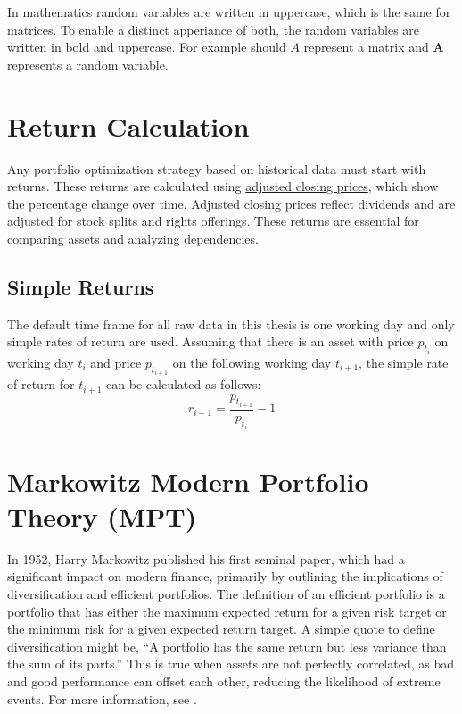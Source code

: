 \documentclass[
  oneside]{book}
\begin{document}
In mathematics random variables are written in uppercase, which is the same for matrices. To enable a distinct apperiance of both, the random variables are written in bold and uppercase. For example should \(A\) represent a matrix and \(\pmb{A}\) represents a random variable.

\hypertarget{return-calculation}{%
\section{Return Calculation}\label{return-calculation}}

Any portfolio optimization strategy based on historical data must start with returns. These returns are calculated using \href{https://www.investopedia.com/terms/a/adjusted\%20closingprice.asp}{adjusted closing prices}, which show the percentage change over time. Adjusted closing prices reflect dividends and are adjusted for stock splits and rights offerings. These returns are essential for comparing assets and analyzing dependencies.

\hypertarget{simple-returns}{%
\subsection{Simple Returns}\label{simple-returns}}

The default time frame for all raw data in this thesis is one working day and only simple rates of return are used. Assuming that there is an asset with price \(p_{t_i}\) on working day \(t_i\) and price \(p_{t_{i+1}}\) on the following working day \(t_{i+1}\), the simple rate of return for \(t_{i+1}\) can be calculated as follows:
\[
  r_{i+1} = \frac{p_{t_{i+1}}}{p_{t_i}}-1
\]

\hypertarget{markowitz-modern-portfolio-theory-mpt}{%
\section{Markowitz Modern Portfolio Theory (MPT)}\label{markowitz-modern-portfolio-theory-mpt}}

In 1952, Harry Markowitz published his first seminal paper, which had a significant impact on modern finance, primarily by outlining the implications of diversification and efficient portfolios. The definition of an efficient portfolio is a portfolio that has either the maximum expected return for a given risk target or the minimum risk for a given expected return target. A simple quote to define diversification might be, ``A portfolio has the same return but less variance than the sum of its parts.'' This is true when assets are not perfectly correlated, as bad and good performance can offset each other, reducing the likelihood of extreme events. For more information, see \citep{Mari2005}.
\end{document}
